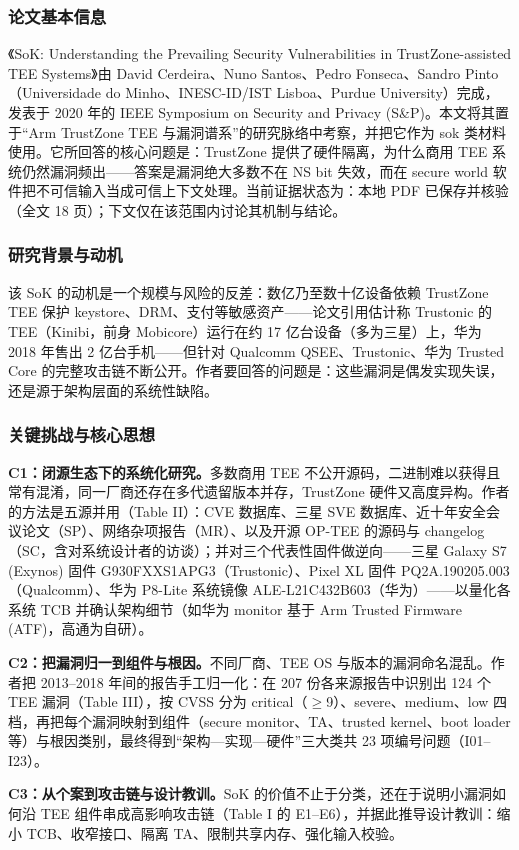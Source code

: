 \documentclass[11pt]{ctexart}
\begin{document}
\subsubsection{论文基本信息}
《SoK: Understanding the Prevailing Security Vulnerabilities in TrustZone-assisted TEE Systems》由 David Cerdeira、Nuno Santos、Pedro Fonseca、Sandro Pinto（Universidade do Minho、INESC-ID/IST Lisboa、Purdue University）完成，发表于 2020 年的 IEEE Symposium on Security and Privacy (S\&P)。本文将其置于``Arm TrustZone TEE 与漏洞谱系''的研究脉络中考察，并把它作为 sok 类材料使用。它所回答的核心问题是：TrustZone 提供了硬件隔离，为什么商用 TEE 系统仍然漏洞频出——答案是漏洞绝大多数不在 NS bit 失效，而在 secure world 软件把不可信输入当成可信上下文处理。当前证据状态为：本地 PDF 已保存并核验（全文 18 页）；下文仅在该范围内讨论其机制与结论。\cite{cerdeira2020trustzone}\par
\subsubsection{研究背景与动机}
该 SoK 的动机是一个规模与风险的反差：数亿乃至数十亿设备依赖 TrustZone TEE 保护 keystore、DRM、支付等敏感资产——论文引用估计称 Trustonic 的 TEE（Kinibi，前身 Mobicore）运行在约 17 亿台设备（多为三星）上，华为 2018 年售出 2 亿台手机——但针对 Qualcomm QSEE、Trustonic、华为 Trusted Core 的完整攻击链不断公开。作者要回答的问题是：这些漏洞是偶发实现失误，还是源于架构层面的系统性缺陷。\par
\subsubsection{关键挑战与核心思想}
\noindent\textbf{C1：闭源生态下的系统化研究。}多数商用 TEE 不公开源码，二进制难以获得且常有混淆，同一厂商还存在多代遗留版本并存，TrustZone 硬件又高度异构。作者的方法是五源并用（Table II）：CVE 数据库、三星 SVE 数据库、近十年安全会议论文（SP）、网络杂项报告（MR）、以及开源 OP-TEE 的源码与 changelog（SC，含对系统设计者的访谈）；并对三个代表性固件做逆向——三星 Galaxy S7 (Exynos) 固件 G930FXXS1APG3（Trustonic）、Pixel XL 固件 PQ2A.190205.003（Qualcomm）、华为 P8-Lite 系统镜像 ALE-L21C432B603（华为）——以量化各系统 TCB 并确认架构细节（如华为 monitor 基于 Arm Trusted Firmware (ATF)，高通为自研）。\par
\noindent\textbf{C2：把漏洞归一到组件与根因。}不同厂商、TEE OS 与版本的漏洞命名混乱。作者把 2013--2018 年间的报告手工归一化：在 207 份各来源报告中识别出 124 个 TEE 漏洞（Table III），按 CVSS 分为 critical（$\geq$9）、severe、medium、low 四档，再把每个漏洞映射到组件（secure monitor、TA、trusted kernel、boot loader 等）与根因类别，最终得到``架构—实现—硬件''三大类共 23 项编号问题（I01--I23）。\par
\noindent\textbf{C3：从个案到攻击链与设计教训。}SoK 的价值不止于分类，还在于说明小漏洞如何沿 TEE 组件串成高影响攻击链（Table I 的 E1--E6），并据此推导设计教训：缩小 TCB、收窄接口、隔离 TA、限制共享内存、强化输入校验。\par
\end{document}
